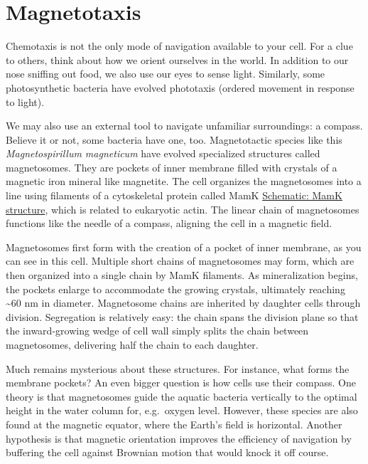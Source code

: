 \documentclass[]{tufte-book}
\begin{document}
\section{Magnetotaxis}\label{magnetotaxis}

Chemotaxis is not the only mode of navigation available to your cell.
For a clue to others, think about how we orient ourselves in the world.
In addition to our nose sniffing out food, we also use our eyes to sense
light. Similarly, some photosynthetic bacteria have evolved phototaxis
(ordered movement in response to light).

We may also use an external tool to navigate unfamiliar surroundings: a
compass. Believe it or not, some bacteria have one, too. Magnetotactic
species like this \emph{Magnetospirillum magneticum} have evolved
specialized structures called magnetosomes. They are pockets of inner
membrane filled with crystals of a magnetic iron mineral like magnetite.
The cell organizes the magnetosomes into a line using filaments of a
cytoskeletal protein called MamK
\protect\hyperlink{MamK_structure}{Schematic: MamK structure}, which is
related to eukaryotic actin. The linear chain of magnetosomes functions
like the needle of a compass, aligning the cell in a magnetic field.

Magnetosomes first form with the creation of a pocket of inner membrane,
as you can see in this cell. Multiple short chains of magnetosomes may
form, which are then organized into a single chain by MamK filaments. As
mineralization begins, the pockets enlarge to accommodate the growing
crystals, ultimately reaching \textasciitilde{}60 nm in diameter.
Magnetosome chains are inherited by daughter cells through division.
Segregation is relatively easy: the chain spans the division plane so
that the inward-growing wedge of cell wall simply splits the chain
between magnetosomes, delivering half the chain to each daughter.

Much remains mysterious about these structures. For instance, what forms
the membrane pockets? An even bigger question is how cells use their
compass. One theory is that magnetosomes guide the aquatic bacteria
vertically to the optimal height in the water column for, e.g.~oxygen
level. However, these species are also found at the magnetic equator,
where the Earth's field is horizontal. Another hypothesis is that
magnetic orientation improves the efficiency of navigation by buffering
the cell against Brownian motion that would knock it off course.
\end{document}
